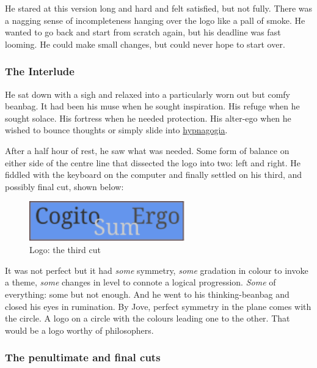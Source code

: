 \documentclass[
  12pt,
  british,
  a4paper,
]{article}
\makeatletter
\newcounter{figno}
\newenvironment{fignos:no-prefix-figure-caption}{
      \caption@ifcompatibility{}{
        \let\oldthefigure\thefigure
        \let\oldtheHfigure\theHfigure
        \renewcommand{\thefigure}{figno:\thefigno}
        \renewcommand{\theHfigure}{figno:\thefigno}
        \stepcounter{figno}
        \captionsetup{labelformat=empty}
      }
    }{
      \caption@ifcompatibility{}{
        \captionsetup{labelformat=default}
        \let\thefigure\oldthefigure
        \let\theHfigure\oldtheHfigure
        \addtocounter{figure}{-1}
      }
    }
\makeatother
\begin{document}
He stared at this version long and hard and felt satisfied, but not
fully. There was a nagging sense of incompleteness hanging over the logo
like a pall of smoke. He wanted to go back and start from scratch again,
but his deadline was fast looming. He could make small changes, but
could never hope to start over.

\hypertarget{the-interlude}{%
\subsubsection{The Interlude}\label{the-interlude}}

He sat down with a sigh and relaxed into a particularly worn out but
comfy beanbag. It had been his muse when he sought inspiration. His
refuge when he sought solace. His fortress when he needed protection.
His alter-ego when he wished to bounce thoughts or simply slide into
\href{https://en.wikipedia.org/wiki/Hypnagogia}{hypnagogia}.

After a half hour of rest, he saw what was needed. Some form of balance
on either side of the centre line that dissected the logo into two: left
and right. He fiddled with the keyboard on the computer and finally
settled on his third, and possibly final cut, shown below:

\begin{fignos:no-prefix-figure-caption}

\begin{figure}
\centering
\includegraphics[width=0.6\textwidth,height=\textheight]{images/thirdcut.svg}
\caption{Logo: the third cut}
\end{figure}

\end{fignos:no-prefix-figure-caption}

It was not perfect but it had \emph{some} symmetry, \emph{some}
gradation in colour to invoke a theme, \emph{some} changes in level to
connote a logical progression. \emph{Some} of everything: some but not
enough. And he went to his thinking-beanbag and closed his eyes in
rumination. By Jove, perfect symmetry in the plane comes with the
circle. A logo on a circle with the colours leading one to the other.
That would be a logo worthy of philosophers.

\hypertarget{the-penultimate-and-final-cuts}{%
\subsubsection{The penultimate and final
cuts}\label{the-penultimate-and-final-cuts}}
\end{document}
